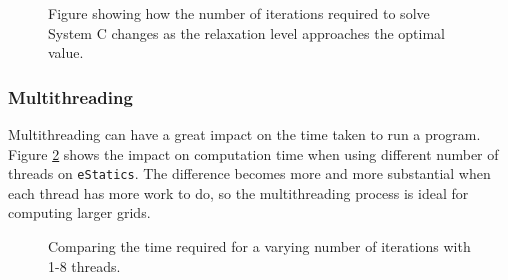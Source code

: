 \begin{figure}[h!]
\centering
\setlength\fboxsep{0pt}
\setlength\fboxrule{0.5pt}
\label{fig:sysC_relax_narrow}
\caption{Figure showing how the number of iterations required to solve System C changes as the relaxation level approaches the optimal value.}
\end{figure}

\subsubsection{Multithreading}
Multithreading can have a great impact on the time taken to run a program. Figure \ref{fig:multiple_multithreads} shows the impact on computation time when using different number of threads on \lstinline|eStatics|. The difference becomes more and more substantial when each thread has more work to do, so the multithreading process is ideal for computing larger grids.

\begin{figure}[h!]
\centering
\setlength\fboxsep{0pt}
\setlength\fboxrule{0.5pt}
\label{fig:multiple_multithreads}
\caption{Comparing the time required for a varying number of iterations with 1-8 threads.}
\end{figure}
